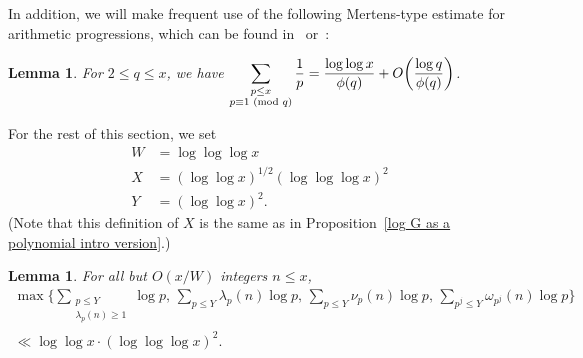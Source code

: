 \documentclass[12pt,reqno]{amsart}
\newtheorem{lemma}[theorem]{Lemma}
\theoremstyle{definition}
\renewcommand{\mod}[1]{{\ifmmode\text{\rm\ (mod~$#1$)}\else\discretionary{}{}{\hbox{ }}\rm(mod~$#1$)\fi}}
\begin{document}
In addition, we will make frequent use of the following Mertens-type estimate for arithmetic progressions, which can be found in~\cite{nor} or~\cite{pom}:
\begin{lemma}\label{mertenspartial}
For $2 \leq q \leq x$, we have $\displaystyle \sum_{\substack{p \leq x \\ p \equiv 1 \mod q}} \frac{1}{p} = \frac{\log\log x}{\phi(q)} + O\bigg( \frac{\log q}{\phi(q)} \bigg)$.
\end{lemma}

For the rest of this section, we set
\begin{align*}
W &= \log\log\log x \\
X &= (\log\log x)^{1/2}(\log\log\log x)^2 \\
Y &= (\log\log x)^2.
\end{align*}
(Note that this definition of $X$ is the same as in Proposition~\ref{log G as a polynomial intro version}.)

\begin{lemma} \label{triple threat lemma}
For all but $O(x/W)$ integers $n\le x$,
\begin{multline}  \label{four expressions}
\max\bigg\{ \sum_{\substack{p\le Y \\ \lambda_p(n)\ge1}} \log p,\, \sum_{p\le Y} \lambda_p(n)\log p ,\, \sum_{p\le Y} \nu_p(n)\log p ,\, \sum_{p^j\le Y} \omega_{p^j}(n)\log p \bigg\} \\
\ll \log\log x \cdot (\log\log\log x)^2.
\end{multline}
\end{lemma}
\end{document}
